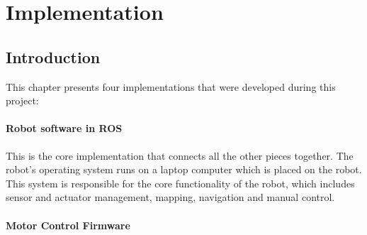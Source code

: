 \chapter{Implementation}
\label{chp:implementation} 

\section{Introduction}

This chapter presents four implementations that were developed during this project:


\subsubsection{Robot software in \ac{ROS}}

This is the core implementation that connects all the other pieces together. The robot's operating system runs on a laptop computer which is placed on the robot. This system is responsible for the core functionality of the robot, which includes sensor and actuator management, mapping, navigation and manual control.

\subsubsection{Motor Control Firmware}

